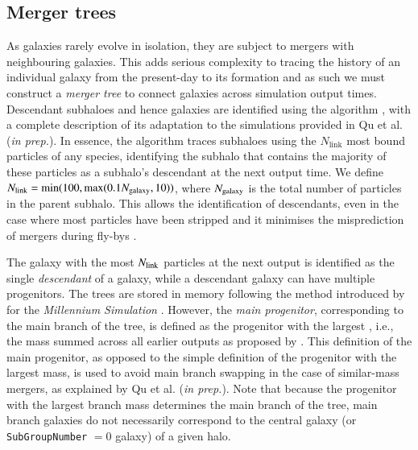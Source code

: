 
\subsection{Merger trees}
\label{subsection:merger_trees}
As galaxies rarely evolve in isolation, they are subject to mergers with
neighbouring galaxies.  This adds serious complexity to tracing the history of
an individual galaxy from the present-day to its formation and as such we must
construct a \emph{merger tree} to connect galaxies across simulation output
times. Descendant subhaloes and hence galaxies are identified using the \dtrees
algorithm \citep{Jiang2014}, with a complete description of its adaptation to
the \eagle simulations provided in Qu et al. (\textit{in prep.}). In essence,
the algorithm traces subhaloes using the $N_{\text{link}}$ most bound particles
of any species, identifying the subhalo that contains the majority of these
particles as a subhalo's descendant at the next output time.  We define $N_{\rm
  link} = \min(100, \max(0.1N_{\rm galaxy}, 10))$, where $N_{\rm galaxy}$ is the
total number of particles in the parent subhalo.  This allows the identification
of descendants, even in the case where most particles have been stripped and it
minimises the misprediction of mergers during fly-bys \citep{Fakhouri08,
  Genel09}.

The galaxy with the most $N_{\rm link}$ particles at the next output is
identified as the single \emph{descendant} of a galaxy, while a descendant
galaxy can have multiple progenitors. The trees are stored in memory following
the method introduced by \cite{Lemson2006a} for the \emph{Millennium Simulation}
\citep[See also the supplementary material of][where the details of the tree
  ordering are summarized]{Springel2005b}. However, the
\emph{main progenitor}, corresponding to the main branch of the tree, is defined
as the progenitor with the largest , i.e., the mass summed
across all earlier outputs as proposed by \cite{DeLucia_Blaizot2007}. This
definition of the main progenitor, as opposed to the simple definition of the
progenitor with the largest mass, is used to avoid main branch swapping in the
case of similar-mass mergers, as explained by Qu et al. (\textit{in
  prep.}). Note that because the progenitor with the largest branch mass
determines the main branch of the tree, main branch galaxies do not necessarily
correspond to the central galaxy (or \texttt{SubGroupNumber} $= 0$ galaxy) of a
given halo.

